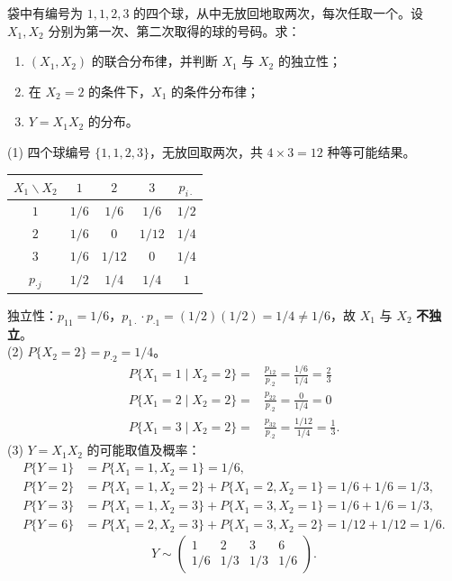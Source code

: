 ﻿\documentclass[lang=cn,11pt]{elegantbook}
\begin{document}
\begin{exercise}[无放回取球] \label{exer:3-c8}
袋中有编号为 $1,1,2,3$ 的四个球，从中无放回地取两次，每次任取一个。设 $X_1, X_2$ 分别为第一次、第二次取得的球的号码。求：
\begin{enumerate}
    \item[(1)] $(X_1,X_2)$ 的联合分布律，并判断 $X_1$ 与 $X_2$ 的独立性；
    \item[(2)] 在 $X_2=2$ 的条件下，$X_1$ 的条件分布律；
    \item[(3)] $Y = X_1X_2$ 的分布。
\end{enumerate}
\end{exercise}
\begin{solution}
(1) 四个球编号 $\{1,1,2,3\}$，无放回取两次，共 $4\times 3 = 12$ 种等可能结果。
\begin{center}
\begin{tabular}{c|ccc|c}
\toprule
$X_1 \backslash X_2$ & $1$ & $2$ & $3$ & $p_{i\cdot}$ \\
\midrule
$1$ & $1/6$ & $1/6$ & $1/6$ & $1/2$ \\[4pt]
$2$ & $1/6$ & $0$ & $1/12$ & $1/4$ \\[4pt]
$3$ & $1/6$ & $1/12$ & $0$ & $1/4$ \\
\midrule
$p_{\cdot j}$ & $1/2$ & $1/4$ & $1/4$ & $1$ \\
\bottomrule
\end{tabular}
\end{center}
独立性：$p_{11} = 1/6$，$p_{1\cdot}\cdot p_{\cdot 1} = (1/2)(1/2) = 1/4 \neq 1/6$，故 $X_1$ 与 $X_2$ \textbf{不独立}。\\
(2) $P\{X_2=2\} = p_{\cdot 2} = 1/4$。
\begin{align*}
P\{X_1=1 \mid X_2=2\} =& \frac{p_{12}}{p_{\cdot 2}} = \frac{1/6}{1/4} = \frac{2}{3}\\
P\{X_1=2 \mid X_2=2\} = &\frac{p_{22}}{p_{\cdot 2}} = \frac{0}{1/4} = 0\\
 P\{X_1=3 \mid X_2=2\} = &\frac{p_{32}}{p_{\cdot 2}} = \frac{1/12}{1/4} = \frac{1}{3}.
\end{align*}
(3) $Y = X_1X_2$ 的可能取值及概率：
\begin{align*}
P\{Y=1\} &= P\{X_1=1,X_2=1\} = 1/6, \\
P\{Y=2\} &= P\{X_1=1,X_2=2\} + P\{X_1=2,X_2=1\} = 1/6 + 1/6 = 1/3, \\
P\{Y=3\} &= P\{X_1=1,X_2=3\} + P\{X_1=3,X_2=1\} = 1/6 + 1/6 = 1/3, \\
P\{Y=6\} &= P\{X_1=2,X_2=3\} + P\{X_1=3,X_2=2\} = 1/12 + 1/12 = 1/6.
\end{align*}
\[
Y \sim \begin{pmatrix} 1 & 2 & 3 & 6 \\ 1/6 & 1/3 & 1/3 & 1/6 \end{pmatrix}.
\]
\end{solution}
\end{document}
